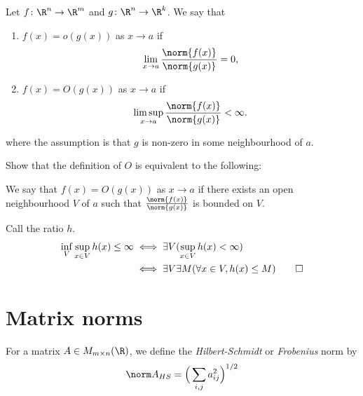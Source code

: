 \begin{definition*}[$O$ notation] \label{def:o}
    Let $f\colon \R^n \to \R^m$ and $g\colon \R^n \to \R^k$.
    We say that
    \begin{enumerate}
        \item $f(x) = o(g(x))$ as $x \to a$ if \[
            \lim_{x \to a} \frac{\norm{f(x)}}{\norm{g(x)}} = 0,
        \]
        \item $f(x) = O(g(x))$ as $x \to a$ if \[
            \limsup_{x \to a} \frac{\norm{f(x)}}{\norm{g(x)}} < \infty.
        \]
    \end{enumerate}
    where the assumption is that $g$ is non-zero in some
    neighbourhood of $a$.
\end{definition*}

\begin{exercise}
    Show that the definition of $O$ is equivalent to the following:

    We say that $f(x) = O(g(x))$ as $x \to a$ if there exists an open
    neighbourhood $V$ of $a$ such that $\frac{\norm{f(x)}}{\norm{g(x)}}$
    is bounded on $V$.
\end{exercise}
\begin{solution}
    Call the ratio $h$.
    \begin{align*}
        \inf_V \sup_{x \in V} h(x) \le \infty
            &\iff \exists V (\sup_{x \in V} h(x) < \infty) \\
            &\iff \exists V \exists M (\forall x \in V, h(x) \le M) \qedhere
    \end{align*}
\end{solution}

\begin{exercise}
    
\end{exercise}

\section{Matrix norms} \label{sec:matrix-norms}

\begin{definition*} \label{def:hsn}
    For a matrix $A \in M_{m \times n}(\R)$, we define the
    \emph{Hilbert-Schmidt} or \emph{Frobenius} norm by \[
        \hsn A = \Big(\sum_{i,j} a_{ij}^2\Big)^{1/2}
    \]
\end{definition*}

